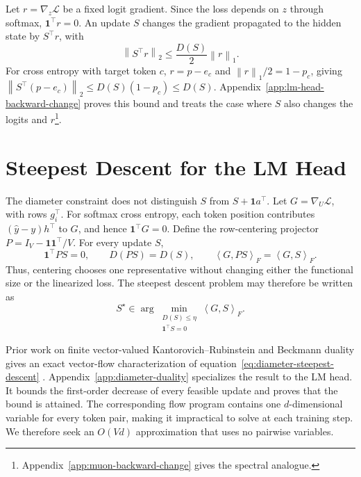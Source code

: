 \documentclass[anon]{opt2026} %
\newcommand{\one}{\mathbf{1}}
\newcommand{\norm}[1]{\left\lVert #1\right\rVert}
\newcommand{\inner}[2]{\left\langle #1,#2\right\rangle}
\begin{document}
Let $r=\nabla_z\mathcal L$ be a fixed logit gradient. Since the loss depends on $z$ through softmax, $\one^\top r=0$. An update $S$ changes the gradient propagated to the hidden state by $S^\top r$, with
\begin{equation}
\boxed{\norm{S^\top r}_2\leq\frac{D(S)}{2}\norm{r}_1.}
\label{eq:fixed-cotangent-backward-bound}
\end{equation}
For cross entropy with target token $c$, $r=p-e_c$ and $\norm{r}_1/2=1-p_c$, giving $\norm{S^\top(p-e_c)}_2\leq D(S)(1-p_c)\leq D(S)$.  Appendix~\ref{app:lm-head-backward-change} proves this bound and treats the case where $S$ also changes the logits and $r$\footnote{Appendix~\ref{app:muon-backward-change} gives the spectral analogue.}.


\section{Steepest Descent for the LM Head}
\label{sec:steepest-descent}

The diameter constraint does not distinguish $S$ from $S+\one a^\top$. Let $G=\nabla_U\mathcal L$, with rows $g_i^\top$. For softmax cross entropy, each token position contributes $(\hat y-y)h^\top$ to $G$, and hence $\one^\top G=0$. Define the row-centering projector $P=I_V-\one\one^\top/V$. For every update $S$,
\[
\one^\top PS=0,
\qquad
D(PS)=D(S),
\qquad
\inner{G}{PS}_F=\inner{G}{S}_F.
\]
Thus, centering chooses one representative without changing either the functional size or the linearized loss. The steepest descent problem may therefore be written as
\begin{equation}
\boxed{
S^\star\in
\arg\min_{\substack{D(S)\leq\eta\\\one^\top S=0}}
\inner{G}{S}_F.
}
\label{eq:diameter-steepest-descent}
\end{equation}

Prior work on finite vector-valued Kantorovich--Rubinstein and Beckmann duality gives an exact vector-flow characterization of equation~\ref{eq:diameter-steepest-descent} \citep{ciosmak2021optimaltransportvectormeasures, robertson2025generalizationwassersteindistancebeckmann}.
Appendix~\ref{app:diameter-duality} specializes the result to the LM head. It bounds the first-order decrease of every feasible update and proves that the bound is attained. The corresponding flow program contains one $d$-dimensional variable for every token pair, making it impractical to solve at each training step. We therefore seek an $O(Vd)$ approximation that uses no pairwise variables.
\end{document}
